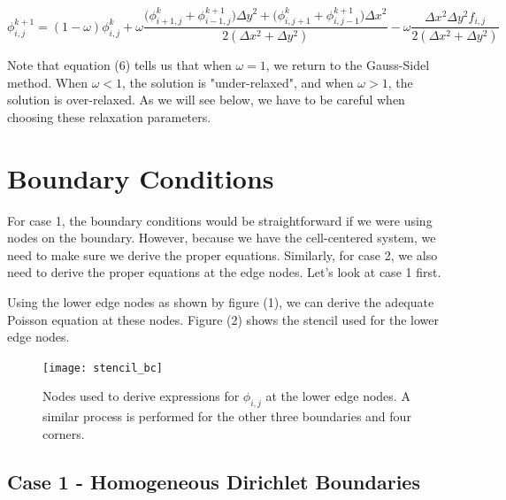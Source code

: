 \documentclass{article}
\begin{document}
\begin{equation}
\phi_{i,j}^{k+1} =  (1 - \omega ) \phi_{i,j}^{k}  +  \omega \frac{  \bigg(  \phi_{i+1,j}^{k}   + \phi_{i-1,j}^{k+1}  \bigg)\Delta y^{2} +  \bigg( \phi_{i,j+1}^{k}  + \phi_{i,j-1}^{k+1}  \bigg)\Delta x^{2}   }{ 2 ( \Delta x^{2} + \Delta y^{2} )} - \omega \frac{\Delta x^{2} \Delta y^{2} f_{i,j}}{2 ( \Delta x^{2} + \Delta y^{2} )}
\end{equation}

\vspace{1em}

\noindent Note that equation (6) tells us that when $\omega =1$, we return to the Gauss-Sidel method. When $\omega < 1$, the solution is "under-relaxed", and when $\omega > 1$, the solution is over-relaxed. As we will see below, we have to be careful when choosing these relaxation parameters.

\section{Boundary Conditions}
 
\noindent For case 1, the boundary conditions would be straightforward if we were using nodes on the boundary. However, because we have the cell-centered system, we need to make sure we derive the proper equations. Similarly, for case 2, we also need to derive the proper equations at the edge nodes. Let's look at case 1 first.

\vspace{1em}

\noindent Using the lower edge nodes as shown by figure (1), we can derive the adequate Poisson equation at these nodes. Figure (2) shows the stencil used for the lower edge nodes.

\begin{figure}[H]
\centering
\texttt{[image: stencil\_bc]}\label{stencil}
\caption{Nodes used to derive expressions for $\phi_{i,j} $ at the lower edge nodes. A similar process is performed for the other three boundaries and four corners. }
\end{figure}

\vspace{1em}
\newpage

\subsection{Case 1 - Homogeneous Dirichlet Boundaries}
\end{document}
